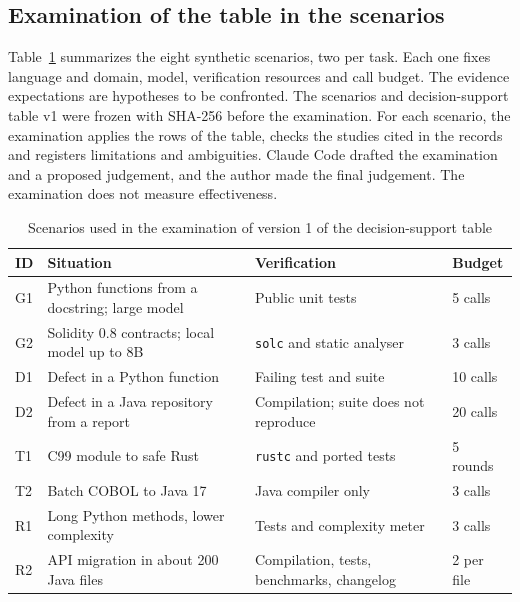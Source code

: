 \subsection{Examination of the table in the scenarios}\label{sec:exame}
Table~\ref{tab:cenarios} summarizes the eight synthetic scenarios, two per task. Each one fixes language and domain,
model, verification resources and call budget. The evidence expectations are hypotheses to be confronted. The
scenarios and decision-support table v1 were frozen with SHA-256 before the examination. For each scenario, the examination applies the
rows of the table, checks the studies cited in the records and registers limitations and ambiguities. Claude Code drafted the examination and a proposed judgement, and the author made the final judgement. The examination does not measure effectiveness.

\begin{table}[!t]
\caption{Scenarios used in the examination of version 1 of the decision-support table}\label{tab:cenarios}
\centering\scriptsize
\setlength{\tabcolsep}{3pt}
\begin{tabular}{@{}p{0.55cm}p{3.2cm}p{2.4cm}p{1.3cm}@{}}
\hline
ID & Situation & Verification & Budget\\
\hline
G1 & Python functions from a docstring; large model & Public unit tests & 5 calls\\
G2 & Solidity 0.8 contracts; local model up to 8B & \texttt{solc} and static analyser & 3 calls\\
D1 & Defect in a Python function & Failing test and suite & 10 calls\\
D2 & Defect in a Java repository from a report & Compilation; suite does not reproduce & 20 calls\\
T1 & C99 module to safe Rust & \texttt{rustc} and ported tests & 5 rounds\\
T2 & Batch COBOL to Java 17 & Java compiler only & 3 calls\\
R1 & Long Python methods, lower complexity & Tests and complexity meter & 3 calls\\
R2 & API migration in about 200 Java files & Compilation, tests, benchmarks, changelog & 2 per file\\
\hline
\end{tabular}
\end{table}

